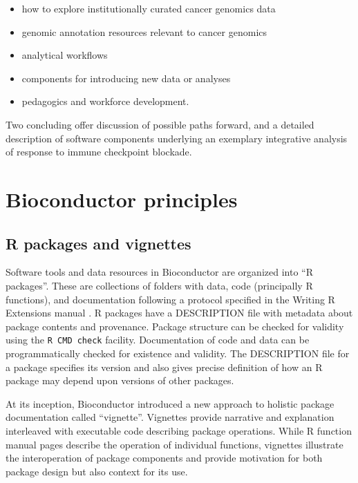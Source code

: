 \documentclass[graybox]{svmult}
\providecommand{\tightlist}{%
  \setlength{\itemsep}{0pt}\setlength{\parskip}{0pt}}
\begin{document}
\begin{itemize}
\tightlist
\item
  how to explore institutionally curated cancer genomics data
\item
  genomic annotation resources relevant to cancer genomics
\item
  analytical workflows
\item
  components for introducing new data or analyses
\item
  pedagogics and workforce development.
\end{itemize}

Two concluding offer discussion of possible paths forward,
and a detailed description of software components
underlying an exemplary integrative analysis of
response to immune checkpoint blockade.


\section{Bioconductor principles}


\subsection{R packages and vignettes}\label{r-packages-and-vignettes}

Software tools and data resources in Bioconductor are organized
into ``R packages''. These are collections of folders with data,
code (principally R functions), and documentation
following a protocol specified in
the
Writing R Extensions manual \cite{WRE}.  R packages have a DESCRIPTION file with metadata about
package contents and provenance. Package structure can be
checked for validity using the \texttt{R CMD check} facility.
Documentation of code and data can be programmatically
checked for existence and validity. The DESCRIPTION file
for a package specifies its version and
also gives precise definition of how an R package may
depend upon versions of other packages.

At its inception,
Bioconductor introduced a new approach to holistic package
documentation called ``vignette''.
Vignettes provide narrative and explanation interleaved with
executable code describing package operations.
While R function manual pages describe
the operation of individual functions,
vignettes illustrate the interoperation
of package components and provide motivation
for both package design but also context
for its use.
\end{document}
